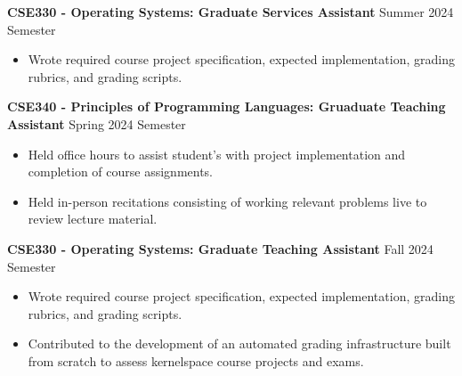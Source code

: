 \textbf{CSE330 - Operating Systems: Graduate Services Assistant} \hfill Summer 2024 Semester
\begin{itemize}
    \item Wrote required course project specification, expected implementation, grading rubrics, and grading scripts.
\end{itemize}
\textbf{CSE340 - Principles of Programming Languages: Gruaduate Teaching Assistant} \hfill Spring 2024 Semester
\begin{itemize}
    \item Held office hours to assist student's with project implementation and completion of course assignments.
    \item Held in-person recitations consisting of working relevant problems live to review lecture material.
\end{itemize}
\textbf{CSE330 - Operating Systems: Graduate Teaching Assistant} \hfill Fall 2024 Semester
\begin{itemize}
    \item Wrote required course project specification, expected implementation, grading rubrics, and grading scripts.
    \item Contributed to the development of an automated grading infrastructure built from scratch to assess kernelspace course projects and exams.
\end{itemize}

